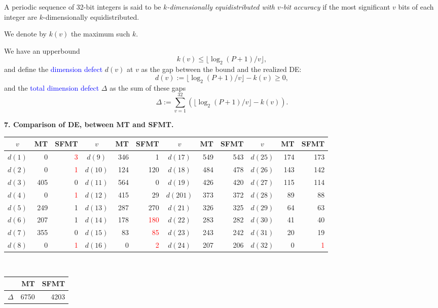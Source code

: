 \documentclass[a4j,12pt,landscape]{jarticle}
\begin{document}
\newpage
A periodic sequence of 32-bit integers is said to be
{\em $k$-dimensionally equidistributed with $v$-bit accuracy}
if the most significant $v$ bits of each integer are
$k$-dimensionally equidistributed. 

We denote by $k(v)$ the maximum such $k$. 

\vskip 5mm
We have an upperbound 
$$
k(v) \leq \lfloor \log_2 (P+1) / v \rfloor, 
$$
and define the \textcolor{blue}{dimension defect} $d(v)$ at $v$
as the gap between the bound and the realized DE:
$$
d(v):= \lfloor \log_2 (P+1) / v \rfloor - k(v) \geq 0, 
$$
and the \textcolor{blue}{total dimension defect} $\Delta$
as the sum of these gaps 
$$
\Delta := \sum_{v=1}^{32}(\lfloor \log_2 (P+1) / v \rfloor -k(v)).
$$

\newpage
{\bf 7. Comparison of DE, between MT and SFMT.}
\begin{center}
\LARGE
\begin{tabular}{|c|rr||c|rr||c|rr||c|rr|} \hline
$v$ & MT & SFMT & $v$ & MT & SFMT & $v$ & MT & SFMT & $v$ & MT & SFMT\\ \hline
$d(1)$& 0 & \textcolor{red}{3}
 &$d(9)$& 346 & 1 & $d(17)$ & 549 & 543 & $d(25)$ & 174 & 173\\
$d(2)$& 0 & \textcolor{red}{1} 
&$d(10)$& 124 & 120 & $d(18)$ & 484 & 478 & $d(26)$ & 143 & 142\\
$d(3)$& 405 & 0 &$d(11)$& 564 & 0 & $d(19)$ & 426 & 420 & $d(27)$ & 115 & 114\\
$d(4)$& 0 & \textcolor{red}{1}
 &$d(12)$& 415 & 29 & $d(201)$ & 373 & 372 & $d(28)$ & 89 & 88\\
$d(5)$& 249 & 1 &$d(13)$& 287 & 270 & $d(21)$ & 326 & 325 & $d(29)$ & 64 & 63\\
$d(6)$& 207 & 1 &$d(14)$& 178 & \textcolor{red}{180}
 & $d(22)$ & 283 & 282 & $d(30)$ & 41 & 40\\
$d(7)$& 355 & 0 &$d(15)$& 83 & \textcolor{red}{85}
 & $d(23)$ & 243 & 242 & $d(31)$ & 20 & 19\\
$d(8)$& 0 & \textcolor{red}{1} &$d(16)$& 0 & \textcolor{red}{2}
 & $d(24)$ & 207 & 206 & $d(32)$ & 0 & \textcolor{red}{1} \\ \hline
\end{tabular}\\
\vskip 10mm
\begin{tabular}{crr}\hline
 & MT & SFMT \\ \hline
  $\Delta$ & 6750 & 4203 \\\hline
\end{tabular}
\end{center}
\end{document}
